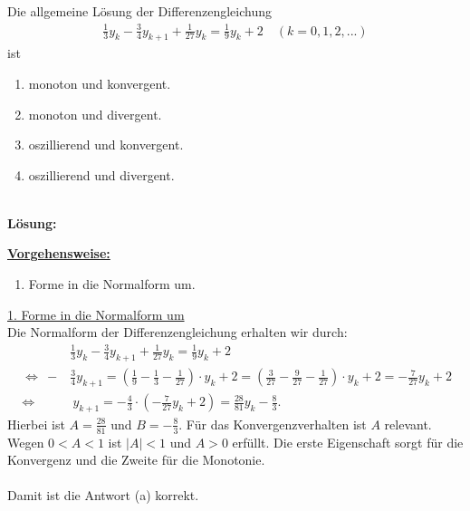 \newpage

\subsection*{}
Die allgemeine Lösung der  Differenzengleichung
\begin{align*}
	\frac{1}{3} y_k - \frac{3}{4} y_{k+1} + \frac{1}{27} y_k  = \frac{1}{9} y_k + 2 \quad (k = 0,1,2,...)
\end{align*}
ist
\renewcommand{\labelenumi}{(\alph{enumi})}
\begin{enumerate}
	\item
	monoton und konvergent.
	\item
	monoton und divergent.	
	\item 
	oszillierend und konvergent.
	\item
	oszillierend und divergent.
\end{enumerate}
\ \\
\textbf{Lösung:}
\begin{mdframed}
\underline{\textbf{Vorgehensweise:}}
\renewcommand{\labelenumi}{\theenumi.}
\begin{enumerate}
\item Forme in die Normalform um.
\end{enumerate}
\end{mdframed}

\underline{1. Forme in die Normalform um}\\
Die Normalform der Differenzengleichung erhalten wir durch:
\begin{align*}
	&\frac{1}{3} y_k - \frac{3}{4} y_{k+1} + \frac{1}{27} y_k  = \frac{1}{9} y_k + 2\\
	\ \Leftrightarrow \
	- &\frac{3}{4} y_{k+1}
	=
	\left(
	\frac{1}{9} - \frac{1}{3} - \frac{1}{27} 
	\right)
	\cdot 
	y_k + 2
	=
	\left(
	\frac{3}{27} - \frac{9}{27} - \frac{1}{27} 
	\right)
	\cdot 
	y_k + 2
	=
	-\frac{7}{27} y_k +2\\
	\ \Leftrightarrow \
	&\ 
	y_{k+1} = -\frac{4}{3} \cdot
	\left(-\frac{7}{27} y_k +2\right)
	=
	\frac{28}{81} y_k -\frac{8}{3}.
\end{align*}
Hierbei ist $ A = \frac{28}{81} $  und $ B= - \frac{8}{3} $.
Für das Konvergenzverhalten ist $ A $ relevant.
Wegen $ 0 < A < 1 $ ist $ |A| < 1 $ und $ A > 0 $ erfüllt.
Die erste Eigenschaft sorgt für die Konvergenz und die Zweite für die Monotonie.\\
\\
Damit ist die Antwort (a) korrekt.
